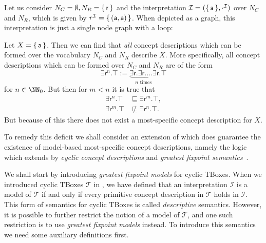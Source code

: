 \begin{Example}
  \label{expl:mmscs-may-not-exist-in-ELbot}
  Let us consider $N_C = \emptyset, N_R = {\{\, \mathsf{r} \,\}}$ and the interpretation
  $\mathcal{I} = ({\{\,\mathsf{a}\,\}}, \cdot^{\mathcal{I}})$ over $N_C$ and $N_R$, which is
  given by $r^{\mathcal{I}} = {\{\, (\mathsf{a}, \mathsf{a}) \,\}}$.  When depicted as a
  graph, this interpretation is just a single node graph with a loop:
  \begin{center}
  \end{center}
  Let $X = {\{\, \mathsf{a} \,\}}$.  Then we can find that \emph{all} \EL concept descriptions
  which can be formed over the vocabulary $N_C$ and $N_R$ describe $X$.  More
  specifically, all \EL concept descriptions which can be formed over $N_C$ and $N_R$ are
  of the form
  \begin{equation*}
    \exists \mathsf{r}^n. \top := \underbrace{\exists \mathsf{r}. \exists \mathsf{r}. \dots \exists
      \mathsf{r}}_{n \text{ times }}. \top
  \end{equation*}
  for $n \in \NN_0$.  But then for $m < n$ it is true that
  \begin{align*}
    \exists \mathsf{r}^{n}. \top &\sqsubseteq \exists \mathsf{r}^m. \top, \\
    \exists \mathsf{r}^{m}. \top &\not\sqsubseteq \exists \mathsf{r}^n. \top.
  \end{align*}
  But because of this there does not exist a most-specific concept description for $X$.
\end{Example}

To remedy this deficit we shall consider an extension of \ELbot which does guarantee the
existence of model-based most-specific concept descriptions, namely the logic \ELgfpbot
which extends \ELbot by \emph{cyclic concept descriptions} and \emph{greatest fixpoint
  semantics}~\cite{DBLP:conf/ijcai/Baader03a,sowa/Nebel91}.

We shall start by introducing \emph{greatest fixpoint models} for cyclic TBoxes.  When we
introduced cyclic TBoxes $\mathcal{T}$ in
, we have defined that an
interpretation $\mathcal{I}$ is a model of $\mathcal{T}$ if and only if every primitive
concept description in $\mathcal{T}$ holds in $\mathcal{I}$.  This form of semantics for
cyclic TBoxes is called \emph{descriptive} semantics.  However, it is possible to further
restrict the notion of a model of $\mathcal{T}$, and one such restriction is to use
\emph{greatest fixpoint models} instead.  To introduce this semantics we need some
auxiliary definitions first.

